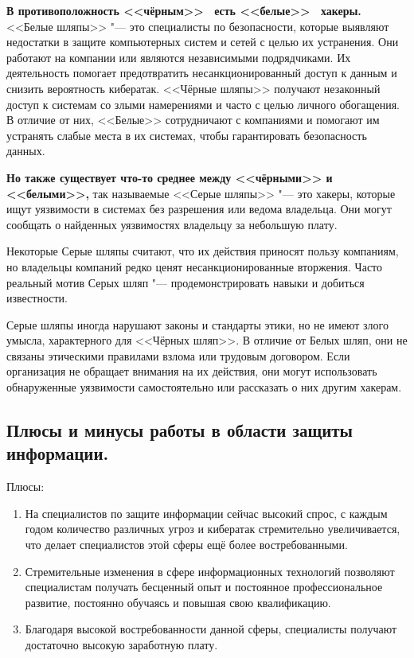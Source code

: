 \textbf{В противоположность <<чёрным>> \ есть <<белые>> \  хакеры.} <<Белые шляпы>> "---  это специалисты по безопасности, которые выявляют недостатки в защите компьютерных систем и сетей с целью их устранения. Они работают на компании или являются независимыми 
подрядчиками. Их деятельность помогает предотвратить несанкционированный доступ к данным и снизить вероятность кибератак.
<<Чёрные шляпы>> получают незаконный доступ к системам со злыми намерениями и часто с целью личного обогащения. В отличие от 
них, <<Белые>> сотрудничают с компаниями и помогают им устранять слабые места в их системах, чтобы гарантировать 
безопасность данных.

\textbf{Но также существует что-то среднее между <<чёрными>> и <<белыми>>,} так называемые <<Серые шляпы>> "---  это хакеры, которые ищут 
уязвимости в системах без разрешения или ведома владельца. Они могут сообщать о найденных уязвимостях владельцу за небольшую 
плату.

Некоторые Серые шляпы считают, что их действия приносят пользу компаниям, но владельцы компаний редко ценят 
несанкционированные вторжения. Часто реальный мотив Серых шляп "---  продемонстрировать навыки и добиться известности.

Серые шляпы иногда нарушают законы и стандарты этики, но не имеют злого умысла, характерного для <<Чёрных шляп>>. В отличие от 
Белых шляп, они не связаны этическими правилами взлома или трудовым договором. Если организация не обращает внимания на их 
действия, они могут использовать обнаруженные уязвимости самостоятельно или рассказать о них другим хакерам\cite{kaspersky}.


\newpage
\subsection{Плюсы и минусы работы в области защиты информации.}
Плюсы:
\begin{enumerate}
    \item На специалистов по защите информации сейчас высокий спрос, с каждым годом количество различных угроз и кибератак 
    стремительно увеличивается, что делает специалистов этой сферы ещё более востребованными.
    \item Стремительные изменения в сфере информационных технологий позволяют специалистам получать бесценный опыт и 
    постоянное профессиональное развитие, постоянно обучаясь и повышая свою квалификацию.
    \item Благодаря высокой востребованности данной сферы, специалисты получают достаточно высокую заработную плату.
\end{enumerate}
 
